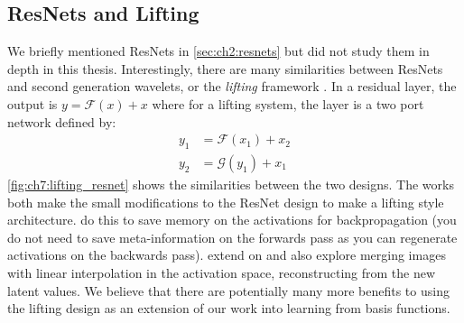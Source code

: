 \subsection{ResNets and Lifting}
\begin{figure}
  \centering
  \qquad
  \label{fig:ch7:lifting_resnet}
\end{figure}

We briefly mentioned ResNets in \autoref{sec:ch2:resnets} but did not study them
in depth in this thesis. Interestingly, there are many similarities between
ResNets and second generation wavelets, or the \emph{lifting} framework
\cite{sweldens_lifting_1998,daubechies_factoring_1998}.
In a residual layer, the output is $y = \mathcal{F}(x) + x$ where for a lifting
system, the layer is a two port network defined by:
\begin{align}
  y_1 &= \mathcal{F}(x_1) + x_2 \\
  y_2 &= \mathcal{G}(y_1) + x_1 
\end{align}
\autoref{fig:ch7:lifting_resnet} shows the similarities between the two designs. 
The works \cite{gomez_reversible_2017, jacobsen_i-revnet:_2018} both make the small modifications
to the ResNet design to make a lifting style architecture.
\citeauthor{gomez_reversible_2017} \cite{gomez_reversible_2017} do this to save
memory on the activations for backpropagation (you do not need to save
meta-information on the forwards pass as you can regenerate activations on the
backwards pass). 
\citeauthor{jacobsen_i-revnet:_2018} \cite{jacobsen_i-revnet:_2018} extend on
\cite{gomez_reversible_2017} and also explore merging images with linear
interpolation in the activation space, reconstructing from the new latent
values. We believe that there are potentially many more benefits to using the
lifting design as an extension of our work into learning from basis functions.

